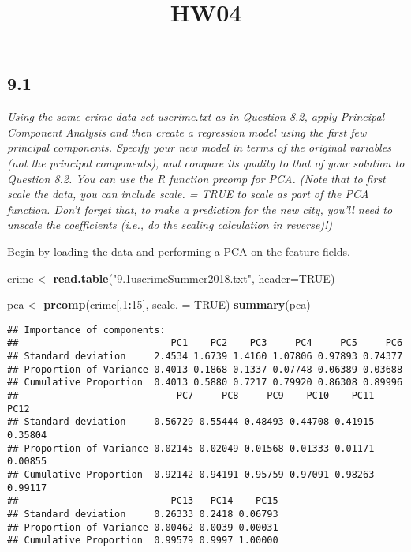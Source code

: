 \documentclass[]{article}
\title{HW04}
\author{}
\date{}
\newenvironment{Shaded}{\begin{snugshade}}{\end{snugshade}}
\newcommand{\KeywordTok}[1]{\textcolor[rgb]{0.13,0.29,0.53}{\textbf{#1}}}
\newcommand{\DataTypeTok}[1]{\textcolor[rgb]{0.13,0.29,0.53}{#1}}
\newcommand{\DecValTok}[1]{\textcolor[rgb]{0.00,0.00,0.81}{#1}}
\newcommand{\StringTok}[1]{\textcolor[rgb]{0.31,0.60,0.02}{#1}}
\newcommand{\OtherTok}[1]{\textcolor[rgb]{0.56,0.35,0.01}{#1}}
\newcommand{\OperatorTok}[1]{\textcolor[rgb]{0.81,0.36,0.00}{\textbf{#1}}}
\newcommand{\NormalTok}[1]{#1}
\begin{document}
\maketitle

\subsection{9.1}\label{section}

\emph{Using the same crime data set uscrime.txt as in Question 8.2,
apply Principal Component Analysis and then create a regression model
using the first few principal components. Specify your new model in
terms of the original variables (not the principal components), and
compare its quality to that of your solution to Question 8.2. You can
use the R function prcomp for PCA. (Note that to first scale the data,
you can include scale. = TRUE to scale as part of the PCA function.
Don't forget that, to make a prediction for the new city, you'll need to
unscale the coefficients (i.e., do the scaling calculation in
reverse)!)}

Begin by loading the data and performing a PCA on the feature fields.

\begin{Shaded}
\begin{Highlighting}[]
\NormalTok{crime <-}\StringTok{ }\KeywordTok{read.table}\NormalTok{(}\StringTok{"9.1uscrimeSummer2018.txt"}\NormalTok{, }\DataTypeTok{header=}\OtherTok{TRUE}\NormalTok{)}

\NormalTok{pca <-}\StringTok{ }\KeywordTok{prcomp}\NormalTok{(crime[,}\DecValTok{1}\OperatorTok{:}\DecValTok{15}\NormalTok{], }\DataTypeTok{scale. =} \OtherTok{TRUE}\NormalTok{)}
\KeywordTok{summary}\NormalTok{(pca)}
\end{Highlighting}
\end{Shaded}

\begin{verbatim}
## Importance of components:
##                           PC1    PC2    PC3     PC4     PC5     PC6
## Standard deviation     2.4534 1.6739 1.4160 1.07806 0.97893 0.74377
## Proportion of Variance 0.4013 0.1868 0.1337 0.07748 0.06389 0.03688
## Cumulative Proportion  0.4013 0.5880 0.7217 0.79920 0.86308 0.89996
##                            PC7     PC8     PC9    PC10    PC11    PC12
## Standard deviation     0.56729 0.55444 0.48493 0.44708 0.41915 0.35804
## Proportion of Variance 0.02145 0.02049 0.01568 0.01333 0.01171 0.00855
## Cumulative Proportion  0.92142 0.94191 0.95759 0.97091 0.98263 0.99117
##                           PC13   PC14    PC15
## Standard deviation     0.26333 0.2418 0.06793
## Proportion of Variance 0.00462 0.0039 0.00031
## Cumulative Proportion  0.99579 0.9997 1.00000
\end{verbatim}
\end{document}
